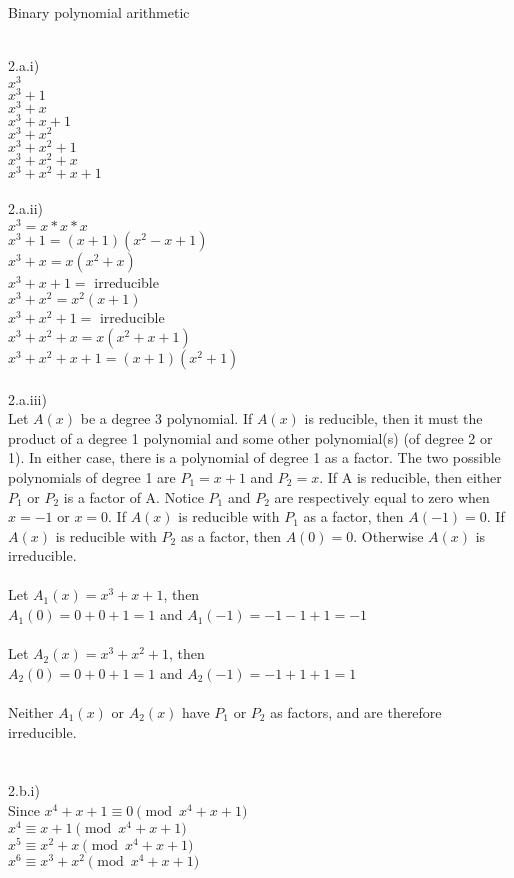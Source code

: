 \documentclass{assignment}
\newcommand\tab[1][0.5cm]{\hspace*{#1}}
\begin{document}
\begin{problemlist}
\pbitem Binary polynomial arithmetic
\begin{problem}
\begin{answer}
\\
2.a.i)\\
$x^3$\\
$x^3+1$\\
$x^3+x$\\
$x^3+x+1$\\
$x^3+x^2$\\
$x^3+x^2+1$\\
$x^3+x^2+x$\\
$x^3+x^2+x+1$\\
\\
2.a.ii)\\
$x^3=x*x*x$\\
$x^3+1=(x+1)(x^2-x+1)$\\
$x^3+x=x(x^2+x)$\\
$x^3+x+1=$ irreducible\\
$x^3+x^2=x^2(x+1)$\\
$x^3+x^2+1=$ irreducible\\
$x^3+x^2+x=x(x^2+x+1)$\\
$x^3+x^2+x+1=(x+1)(x^2+1)$\\
\\
2.a.iii)\\
Let $A(x)$ be a degree 3 polynomial.  If $A(x)$ is reducible, then it must the product of a degree 1 polynomial and some other polynomial(s) (of degree 2 or 1).  In either case, there is a polynomial of degree 1 as a factor.  The two possible polynomials of degree 1 are $P_1=x+1$ and $P_2=x$.  If A is reducible, then either $P_1$ or $P_2$ is a factor of A.  Notice $P_1$ and $P_2$ are respectively equal to zero when $x=-1$ or $x=0$.  If $A(x)$ is reducible with $P_1$ as a factor, then $A(-1)=0$.  If $A(x)$ is reducible with $P_2$ as a factor, then $A(0)=0$.  Otherwise $A(x)$ is irreducible.\\
\\
Let $A_1(x)=x^3+x+1$, then \\
\tab$A_1(0)=0+0+1=1$ and $A_1(-1)=-1-1+1=-1$\\
\\
Let $A_2(x)=x^3+x^2+1$, then \\
\tab$A_2(0)=0+0+1=1$ and $A_2(-1)=-1+1+1=1$\\
\\
Neither $A_1(x)$ or $A_2(x)$ have $P_1$ or $P_2$ as factors, and are therefore irreducible.\\
\\
\\
2.b.i)\\
Since $x^4+x+1\equiv 0  \pmod{x^4+x+1}$\\
$x^4\equiv x+1  \pmod{x^4+x+1}$\\
$x^5\equiv x^2+x  \pmod{x^4+x+1}$\\
$x^6\equiv x^3+x^2  \pmod{x^4+x+1}$\\


\end{answer}
\end{problem}
\end{problemlist}
\end{document}
